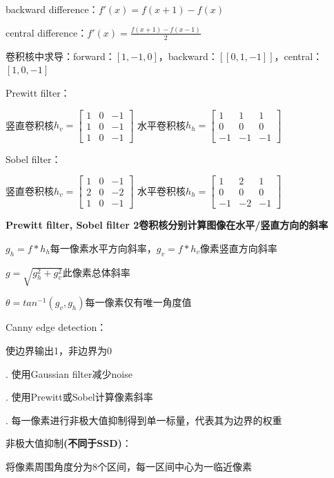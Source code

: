 \documentclass[UTF8]{ctexart}
\begin{document}
  \quad backward difference：$f'(x) = f(x + 1) - f(x)$
  
  \quad central difference：$f'(x) = \frac{f(x + 1) - f(x - 1)}{2}$

  卷积核中求导：forward：$[1, -1, 0]$，backward：$[[0, 1, -1]]$，central：$[1, 0, -1]$

  Prewitt filter：

  \quad 竖直卷积核$h_v = \begin{bmatrix}
    1 & 0 & -1 \\
    1 & 0 & -1 \\
    1 & 0 & -1
    \end{bmatrix}$
    水平卷积核$h_h = \begin{bmatrix}
      1 & 1 & 1 \\
      0 & 0 & 0 \\
      -1 & -1 & -1
      \end{bmatrix}$

  Sobel filter：

  \quad 竖直卷积核$h_v = \begin{bmatrix}
    1 & 0 & -1 \\
    2 & 0 & -2 \\
    1 & 0 & -1
    \end{bmatrix}$
    水平卷积核$h_h = \begin{bmatrix}
      1 & 2 & 1 \\
      0 & 0 & 0 \\
      -1 & -2 & -1
      \end{bmatrix}$

  \textbf{Prewitt filter, Sobel filter 2卷积核分别计算图像在水平/竖直方向的斜率}

  \quad $g_h = f * h_h$每一像素水平方向斜率，$g_v = f * h_v$像素竖直方向斜率

  \quad $g = \sqrt{g_h^2 + g_v^2}$此像素总体斜率

  \quad $\theta = tan^{-1}(g_v, g_h)$每一像素仅有唯一角度值

  Canny edge detection：

  \quad 使边界输出1，非边界为0

  . 使用Gaussian filter减少noise

  . 使用Prewitt或Sobel计算像素斜率

  . 每一像素进行非极大值抑制得到单一标量，代表其为边界的权重

  \quad \quad 非极大值抑制\textbf{(不同于SSD)}：

  \quad \quad \quad 将像素周围角度分为8个区间，每一区间中心为一临近像素
\end{document}
